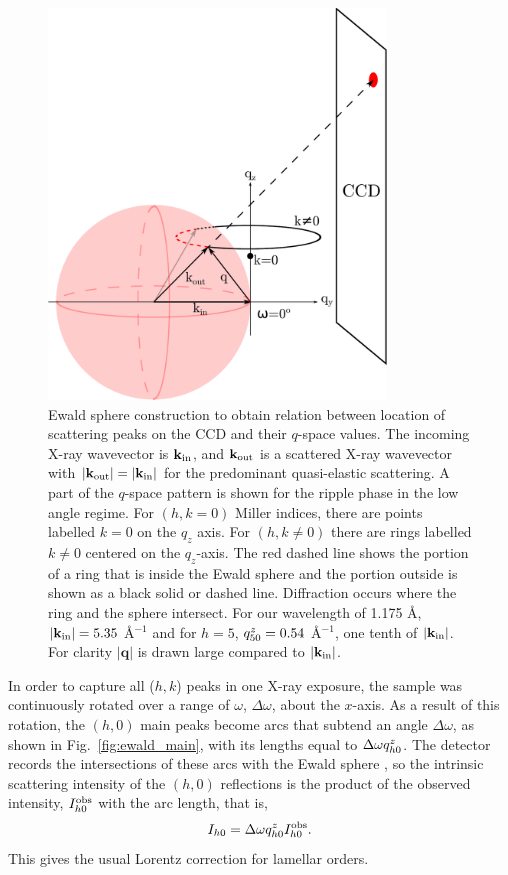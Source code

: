 \begin{figure}[htbp]
  \centering
  \includegraphics[width=0.8\textwidth]{figures/ripple/analysis/ripple_sample_qspace}
  \caption[Ewald sphere construction to obtain relation between location of 
  scattering peaks on the CCD and their $q$-space values]
  {Ewald sphere construction to obtain relation between location of 
  scattering peaks on the CCD and their $q$-space values. The incoming X-ray 
  wavevector is $\mathbf{k}_{\mathrm{in}}$, and $\mathbf{k}_{\mathrm{out}}$ is a scattered X-ray wavevector with 
  $|\mathbf{k}_{\mathrm{out}}|=|\mathbf{k}_{\mathrm{in}}|$ for the predominant quasi-elastic scattering. 
  A part of the $q$-space pattern is shown for the ripple phase in the low angle 
  regime. For $(h, k=0)$ Miller indices, there are points labelled $k=0$ on the 
  $q_z$ axis.  
  For $(h,k\neq0)$ there are rings labelled $k\neq0$ centered on the 
  $q_z$-axis. The red dashed line shows the portion of a ring that is inside 
  the Ewald sphere and the portion outside is shown as a black solid 
  or dashed line. 
  Diffraction occurs where the ring and the sphere intersect. For our wavelength
	of 1.175 \AA, $|\mathbf{k}_{\mathrm{in}}|=5.35$ \AA$^{-1}$ and for $h=5$,
  $q_{50}^z=0.54$ \AA$^{-1}$, one tenth of $|\mathbf{k}_{\mathrm{in}}|$.
  For clarity $|\mathbf{q}|$ is drawn large compared to $|\mathbf{k}_{\mathrm{in}}|$. 
  }
  \label{fig:ripple_sample_qspace}
\end{figure}

In order to capture all ($h, k$) peaks in one X-ray exposure, 
the sample was continuously rotated over a range of $\omega$, $\Delta\omega$,
about the $x$-axis. As a result of this rotation, 
the $(h, 0)$ main peaks become arcs that subtend an angle $\Delta\omega$,
as shown in Fig.~\ref{fig:ewald_main}, with its lengths
equal to $\Delta\omega q_{h0}^z$. 
The detector records the intersections of these arcs with the 
Ewald sphere \cite{ref:Warren69}, 
so the intrinsic scattering intensity of the $(h, 0)$ reflections
is the product of the observed intensity, $I_{h0}^\textrm{obs}$ with the arc length, that is, 
\begin{equation}
  I_{h0} = \Delta\omega q_{h0}^z I_{h0}^\textrm{obs}. \label{eq:main_ewald}
\end{equation}
This gives the usual Lorentz correction for lamellar orders.

